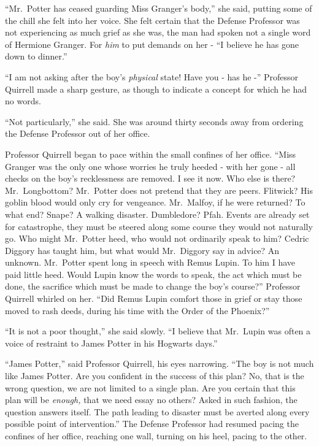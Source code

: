 ``Mr.~Potter has ceased guarding Miss Granger's body,'' she said,
putting some of the chill she felt into her voice. She felt certain that
the Defense Professor was not experiencing as much grief as she was, the
man had spoken not a single word of Hermione Granger. For \emph{him} to
put demands on her - ``I believe he has gone down to dinner.''

``I am not asking after the boy's \emph{physical} state! Have you - has
he -'' Professor Quirrell made a sharp gesture, as though to indicate a
concept for which he had no words.

``Not particularly,'' she said. She was around thirty seconds away from
ordering the Defense Professor out of her office.

Professor Quirrell began to pace within the small confines of her
office. ``Miss Granger was the only one whose worries he truly heeded -
with her gone - all checks on the boy's recklessness are removed. I see
it now. Who else is there? Mr.~Longbottom? Mr.~Potter does not pretend
that they are peers. Flitwick? His goblin blood would only cry for
vengeance. Mr.~Malfoy, if he were returned? To what end? Snape? A
walking disaster. Dumbledore? Pfah. Events are already set for
catastrophe, they must be steered along some course they would not
naturally go. Who might Mr.~Potter heed, who would not ordinarily speak
to him? Cedric Diggory has taught him, but what would Mr.~Diggory say in
advice? An unknown. Mr.~Potter spent long in speech with Remus Lupin. To
him I have paid little heed. Would Lupin know the words to speak, the
act which must be done, the sacrifice which must be made to change the
boy's course?'' Professor Quirrell whirled on her. ``Did Remus Lupin
comfort those in grief or stay those moved to rash deeds, during his
time with the Order of the Phoenix?''

``It is not a poor thought,'' she said slowly. ``I believe that
Mr.~Lupin was often a voice of restraint to James Potter in his Hogwarts
days.''

``James Potter,'' said Professor Quirrell, his eyes narrowing. ``The boy
is not much like James Potter. Are you confident in the success of this
plan? No, that is the wrong question, we are not limited to a single
plan. Are you certain that this plan will be \emph{enough,} that we need
essay no others? Asked in such fashion, the question answers itself. The
path leading to disaster must be averted along every possible point of
intervention.'' The Defense Professor had resumed pacing the confines of
her office, reaching one wall, turning on his heel, pacing to the other.

